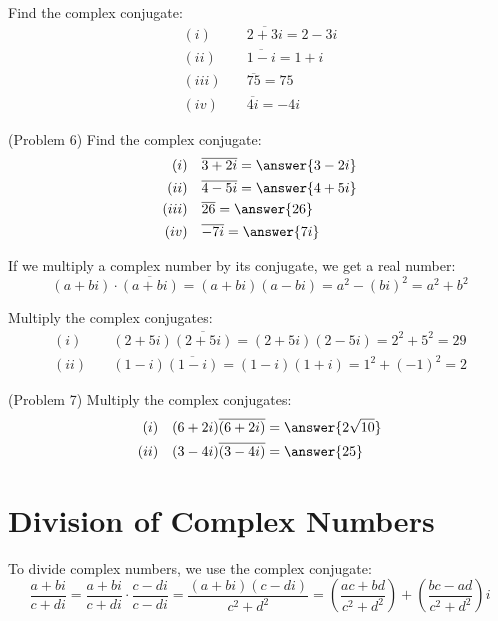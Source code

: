 \documentclass[handout]{ximera}
\begin{document}
\begin{example}[Example 6]
Find the complex conjugate:
\begin{align*}
(i)& \quad \overline {2+3i} = 2-3i \\
(ii)& \quad \overline {1-i} = 1+i \\
(iii)& \quad \overline {75} = 75 \\
(iv)& \quad \overline {4i} = -4i
\end{align*}
\end{example}


\begin{problem}(Problem 6)
Find the complex conjugate:
\begin{align*}
(i)& \quad {\overline {3+2i}} = \answer{3-2i} \\
(ii)& \quad {\overline {4-5i}} = \answer{4+5i}\\
(iii)& \quad {\overline {26}}= \answer{26}\\
(iv)& \quad {\overline {-7i}}= \answer{7i}
\end{align*}
\end{problem}


If we multiply a complex number by its conjugate, we get a real number:
\[
(a+bi)  \cdot \overline{(a+bi)} = (a+bi)(a-bi) = a^2 - (bi)^2 = a^2 +b^2
\]

\begin{example}[Example 7]
Multiply the complex conjugates:
\begin{align*}
(i)& \quad (2+5i) \overline {(2+5i)} = (2+5i)(2-5i) = 2^2 + 5^2 = 29\\
(ii)& \quad (1-i) \overline {(1-i)} = (1-i)(1+i) = 1^2 + (-1)^2 = 2
\end{align*}
\end{example}

\begin{problem}(Problem 7)
Multiply the complex conjugates:
\begin{align*}
(i)& \quad (6+2i) \overline{(6+2i)} = \answer{2\sqrt{10}} \\
(ii)& \quad (3-4i) \overline {(3-4i)} = \answer{25}
\end{align*}
\end{problem}


\section{Division of Complex Numbers}
To divide complex numbers, we use the complex conjugate:
\[
\frac{a+bi}{c+di} = \frac{a+bi}{c+di}\cdot\frac{c-di}{c-di} = \frac{(a+bi)(c-di)}{c^2 + d^2} = \left(\frac{ac+bd}{c^2 + d^2}\right) + \left(\frac{bc-ad}{c^2 + d^2}\right)i
\]
\end{document}
